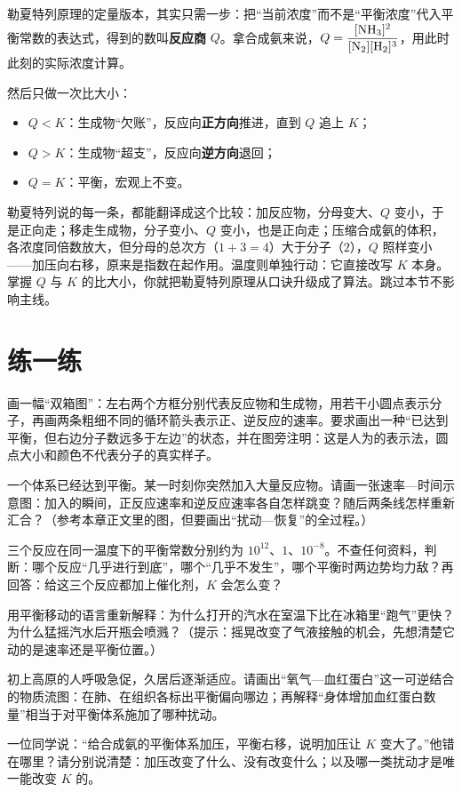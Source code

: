 \begin{tiaozhan}
勒夏特列原理的定量版本，其实只需一步：把“当前浓度”而不是“平衡浓度”代入平衡常数的表达式，得到的数叫\textbf{反应商} $Q$。拿合成氨来说，$Q=\dfrac{[\mathrm{NH_3}]^{2}}{[\mathrm{N_2}][\mathrm{H_2}]^{3}}$，用此时此刻的实际浓度计算。

然后只做一次比大小：
\begin{itemize}[itemsep=2pt]
\item $Q<K$：生成物“欠账”，反应向\textbf{正方向}推进，直到 $Q$ 追上 $K$；
\item $Q>K$：生成物“超支”，反应向\textbf{逆方向}退回；
\item $Q=K$：平衡，宏观上不变。
\end{itemize}
勒夏特列说的每一条，都能翻译成这个比较：加反应物，分母变大、$Q$ 变小，于是正向走；移走生成物，分子变小、$Q$ 变小，也是正向走；压缩合成氨的体积，各浓度同倍数放大，但分母的总次方（$1+3=4$）大于分子（$2$），$Q$ 照样变小——加压向右移，原来是指数在起作用。温度则单独行动：它直接改写 $K$ 本身。掌握 $Q$ 与 $K$ 的比大小，你就把勒夏特列原理从口诀升级成了算法。跳过本节不影响主线。
\end{tiaozhan}

\section*{练一练}

\begin{sikaoti}
\item 画一幅“双箱图”：左右两个方框分别代表反应物和生成物，用若干小圆点表示分子，再画两条粗细不同的循环箭头表示正、逆反应的速率。要求画出一种“已达到平衡，但右边分子数远多于左边”的状态，并在图旁注明：这是人为的表示法，圆点大小和颜色不代表分子的真实样子。
\item 一个体系已经达到平衡。某一时刻你突然加入大量反应物。请画一张速率—时间示意图：加入的瞬间，正反应速率和逆反应速率各自怎样跳变？随后两条线怎样重新汇合？（参考本章正文里的图，但要画出“扰动—恢复”的全过程。）
\item 三个反应在同一温度下的平衡常数分别约为 $10^{12}$、$1$、$10^{-8}$。不查任何资料，判断：哪个反应“几乎进行到底”，哪个“几乎不发生”，哪个平衡时两边势均力敌？再回答：给这三个反应都加上催化剂，$K$ 会怎么变？
\item 用平衡移动的语言重新解释：为什么打开的汽水在室温下比在冰箱里“跑气”更快？为什么猛摇汽水后开瓶会喷溅？（提示：摇晃改变了气液接触的机会，先想清楚它动的是速率还是平衡位置。）
\item 初上高原的人呼吸急促，久居后逐渐适应。请画出“氧气—血红蛋白”这一可逆结合的物质流图：在肺、在组织各标出平衡偏向哪边；再解释“身体增加血红蛋白数量”相当于对平衡体系施加了哪种扰动。
\item 一位同学说：“给合成氨的平衡体系加压，平衡右移，说明加压让 $K$ 变大了。”他错在哪里？请分别说清楚：加压改变了什么、没有改变什么；以及哪一类扰动才是唯一能改变 $K$ 的。
\end{sikaoti}
